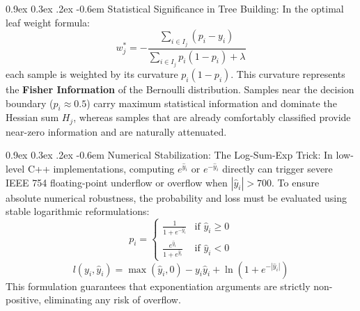 \documentclass[11pt,a4paper]{article}
\makeatletter
\renewcommand\paragraph{\@startsection{paragraph}{4}{\z@}%
                                     {0.9ex \@plus0.3ex \@minus.2ex}%
                                     {-0.6em}%
                                     {\normalfont\normalsize\bfseries}}
\makeatother
\begin{document}
\paragraph{Statistical Significance in Tree Building:}
In the optimal leaf weight formula:
\begin{equation}
    w_j^* = -\frac{\sum_{i \in I_j} (p_i - y_i)}{\sum_{i \in I_j} p_i(1 - p_i) + \lambda}
\end{equation}
each sample is weighted by its curvature $p_i(1 - p_i)$. This curvature represents the \textbf{Fisher Information} of the Bernoulli distribution. Samples near the decision boundary ($p_i \approx 0.5$) carry maximum statistical information and dominate the Hessian sum $H_j$, whereas samples that are already comfortably classified provide near-zero information and are naturally attenuated.

\paragraph{Numerical Stabilization: The Log-Sum-Exp Trick:}
In low-level C++ implementations, computing $e^{\hat{y}_i}$ or $e^{-\hat{y}_i}$ directly can trigger severe IEEE 754 floating-point underflow or overflow when $|\hat{y}_i| > 700$. To ensure absolute numerical robustness, the probability and loss must be evaluated using stable logarithmic reformulations:
\begin{equation}
    p_i = \begin{cases}
        \frac{1}{1 + e^{-\hat{y}_i}} & \text{if } \hat{y}_i \ge 0 \\
        \frac{e^{\hat{y}_i}}{1 + e^{\hat{y}_i}} & \text{if } \hat{y}_i < 0
    \end{cases}
\end{equation}
\begin{equation}
    l(y_i, \hat{y}_i) = \max(\hat{y}_i, 0) - y_i \hat{y}_i + \ln\left(1 + e^{-|\hat{y}_i|}\right)
\end{equation}
This formulation guarantees that exponentiation arguments are strictly non-positive, eliminating any risk of overflow.
\end{document}
